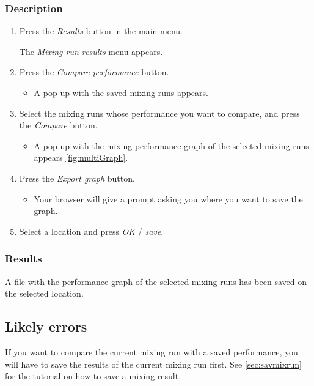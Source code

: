 \subsubsection{Description}
\begin{enumerate}
	\item Press the \emph{Results} button in the main menu.
		\begin{itemize}
            The \emph{Mixing run results} menu appears.
		\end{itemize}
	\item Press the \emph{Compare performance} button.
		\begin{itemize}
            \item A pop-up with the saved mixing runs appears.
		\end{itemize}
	\item Select the mixing runs whose performance you want to compare, and press the \emph{Compare} button. \label{item:exportMultiGraphComp}
		\begin{itemize}
            \item A pop-up with the mixing performance graph of the selected mixing runs appears \ref{fig:multiGraph}.
		\end{itemize}
	\item Press the \emph{Export graph} button.
        \begin{itemize}
            \item Your browser will give a prompt asking you where you want to save the graph.
        \end{itemize}
	\item  Select a location and press \emph{OK} / \emph{save}.
\end{enumerate}


\subsubsection{Results}
A file with the performance graph of the selected mixing runs has been saved on the selected location.

\subsection{Likely errors}
If you want to compare the current mixing run with a saved performance, you will have to save the results of the current mixing run first. See \ref{sec:savmixrun} for the tutorial on how to save a mixing result.

